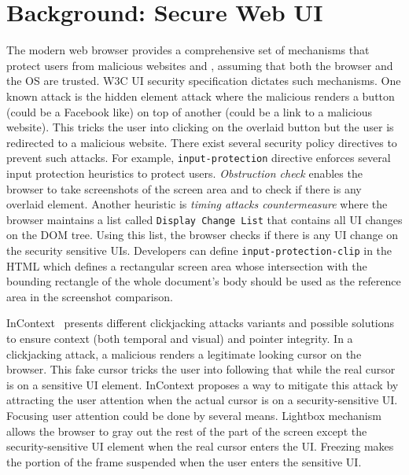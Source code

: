 \section{Background: Secure Web UI}
\label{sec:background}

The modern web browser provides a comprehensive set of mechanisms that protect users from malicious websites and \js, assuming that both the browser and the OS are trusted. W3C UI security specification \cite{w3c_spec} dictates such mechanisms. One known attack is the hidden element attack where the malicious \js renders a button (could be a Facebook like) on top of another (could be a link to a malicious website). This tricks the user into clicking on the overlaid button but the user is redirected to a malicious website. There exist several security policy directives to prevent such attacks. For example, \texttt{input-protection} directive enforces several input protection heuristics to protect users. \emph{Obstruction check} enables the browser to take screenshots of the screen area and to check if there is any overlaid element. Another heuristic is \emph{timing attacks countermeasure} where the browser maintains a list called \texttt{Display Change List} that contains all UI changes on the DOM tree. Using this list, the browser checks if there is any UI change on the security sensitive UIs. Developers can define \texttt{input-protection-clip} in the HTML which defines a rectangular screen area whose intersection with the bounding rectangle of the whole document's body should be used as the reference area in the screenshot comparison.

InContext~\cite{huang2012clickjacking} presents different clickjacking attacks variants and possible solutions to ensure context (both temporal and visual) and pointer integrity. In a clickjacking attack, a malicious \js renders a legitimate looking cursor on the browser. This fake cursor tricks the user into following that while the real cursor is on a sensitive UI element. InContext proposes a way to mitigate this attack by attracting the user attention when the actual cursor is on a security-sensitive UI. Focusing user attention could be done by several means. Lightbox mechanism allows the browser to gray out the rest of the part of the screen except the security-sensitive UI element when the real cursor enters the UI. Freezing makes the portion of the frame suspended when the user enters the sensitive UI. %